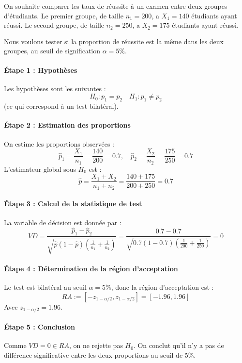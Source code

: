 \begin{example}
    On souhaite comparer les taux de réussite à un examen entre deux groupes d'étudiants.
    Le premier groupe, de taille $n_1 = 200$, a $X_1 = 140$ étudiants ayant réussi.
    Le second groupe, de taille $n_2 = 250$, a $X_2 = 175$ étudiants ayant réussi.

    Nous voulons tester si la proportion de réussite est la même dans les deux groupes, 
    au seuil de signification $\alpha = 5\%$.

    \paragraph{Étape 1 : Hypothèses}  
    Les hypothèses sont les suivantes : 
        \[ H_0 : p_1 = p_2 \quad H_1 : p_1 \neq p_2 \]
    (ce qui correspond à un test bilatéral).

    \paragraph{Étape 2 : Estimation des proportions}  
    On estime les proportions observées :
        \[
            \hat{p}_1 = \frac{X_1}{n_1} = \frac{140}{200} = 0.7, \quad
            \hat{p}_2 = \frac{X_2}{n_2} = \frac{175}{250} = 0.7
        \]
    L'estimateur global sous $H_0$ est :
        \[
            \hat{p} = \frac{X_1 + X_2}{n_1 + n_2} = \frac{140 + 175}{200 + 250} = 0.7
        \]

    \paragraph{Étape 3 : Calcul de la statistique de test}  
    La variable de décision est donnée par :
        \[
            VD = \frac{\hat{p}_1 - \hat{p}_2}{\sqrt{\hat{p}(1-\hat{p}) \left( \frac{1}{n_1} + \frac{1}{n_2} \right)}}
            = \frac{0.7 - 0.7} {\sqrt{0.7(1-0.7) \left( \frac{1}{200} + \frac{1}{250} \right)}}
            = 0 
        \]

    \paragraph{Étape 4 : Détermination de la région d'acceptation}  
    Le test est bilatéral au seuil $\alpha = 5\%$, donc la région d'acceptation est :
        \[
            RA := \left[ -z_{1-\alpha/2}, z_{1-\alpha/2} \right] = [-1.96, 1.96]
        \]
    Avec $z_{1-\alpha/2} = 1.96$.

    \paragraph{Étape 5 : Conclusion}  
    Comme $VD = 0 \in RA$, on ne rejette pas $H_0$.
    On conclut qu'il n'y a pas de différence significative entre les deux proportions 
    au seuil de 5\%.
\end{example}


